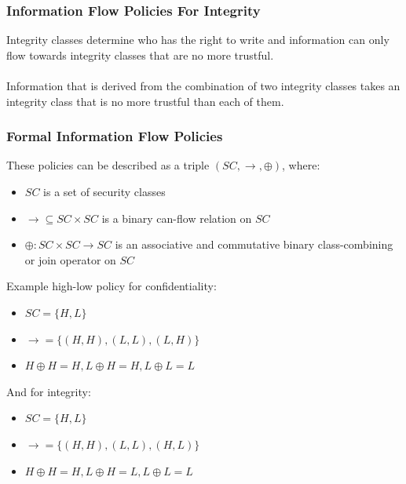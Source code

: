 \documentclass[10pt,a4paper]{report}
\begin{document}
\subsubsection{Information Flow Policies For Integrity}
Integrity classes determine who has the right to write and information can only flow towards integrity classes that are no more trustful.\\
\\
Information that is derived from the combination of two integrity classes takes an integrity class that is no more trustful than each of them.
\subsubsection{Formal Information Flow Policies}
These policies can be described as a triple $(SC, \rightarrow, \oplus)$, where:
\begin{itemize}
\item $SC$ is a set of security classes
\item $\rightarrow \subseteq SC \times SC$ is a binary can-flow relation on $SC$
\item $\oplus: SC \times SC \rightarrow SC$ is an associative and commutative binary class-combining or join operator on $SC$
\end{itemize}
Example high-low policy for confidentiality:
\begin{itemize}
\item $SC = \{H,L\}$
\item $\rightarrow = \{(H,H), (L,L), (L,H)\}$
\item $H \oplus H = H, L \oplus H = H, L \oplus L = L$
\end{itemize}
And for integrity:
\begin{itemize}
\item $SC = \{H,L\}$
\item $\rightarrow = \{(H,H), (L,L), (H,L)\}$
\item $H \oplus H = H, L \oplus H = L, L \oplus L = L$
\end{itemize}
\end{document}
